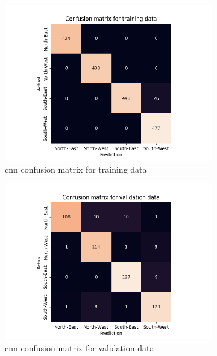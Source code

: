 \documentclass[10pt,twocolumn,letterpaper]{article}
\begin{document}
\begin{figure}
  \centering
  \begin{subfigure}{.33\linewidth}
    \includegraphics[width=\linewidth, trim={7em, 0em, 9em, 5em}, clip]{cnn_cfsn_train}
    \caption{\acrshort{cnn} confusion matrix for training data}
    \label{fig:cnn_train}
  \end{subfigure}
  \begin{subfigure}{0.33\linewidth}
    \includegraphics[width=\linewidth, trim={7em, 0em, 9em, 5em}, clip]{cnn_cfsn_valid}
    \caption{\acrshort{cnn} confusion matrix for validation data}
    \label{fig:cnn_valid}
  \end{subfigure}
  \begin{subfigure}{0.33\linewidth}

\end{subfigure}
\end{figure}
\end{document}
